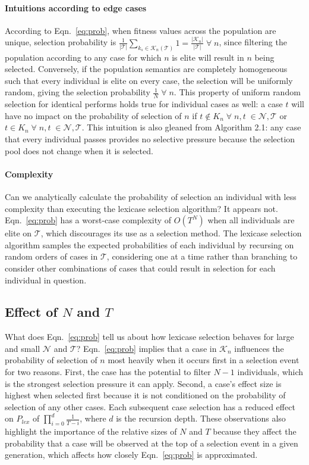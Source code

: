 \documentclass[twoside]{article}
\begin{document}
\paragraph{Intuitions according to edge cases}
According to Eqn.~\ref{eq:prob}, when fitness values across the population are unique, selection probability is $\frac{1}{|\mathcal{T}|} \sum_{k_s \in \mathcal{K}_n(\mathcal{T})} 1 = \frac{|\mathcal{K}_n|}{|\mathcal{T}|} \; \forall \; n$, since filtering the population according to any case for which $n$ is elite will result in $n$ being selected. Conversely, if the population semantics are completely homogeneous such that every individual is elite on every case, the selection will be uniformly random, giving the selection probability $\frac{1}{N} \; \forall \; n$. This property of uniform random selection for identical performs holds true for individual cases as well: a case $t$ will have no impact on the probability of selection of $n$ if $t \notin K_n \; \forall \; n,t \; \in \mathcal{N}, \mathcal{T}$ or $t \in K_n \; \forall \; n,t \; \in \mathcal{N}, \mathcal{T}$. This intuition is also gleaned from Algorithm 2.1: any case that every individual passes provides no selective pressure because the selection pool does not change when it is selected.


\paragraph{Complexity}
Can we analytically calculate the probability of selection an individual with less complexity than executing the lexicase selection algorithm? It appears not. Eqn.~\ref{eq:prob} has a worst-case complexity of $O(T^N)$ when all individuals are elite on $\mathcal{T}$, which discourages its use as a selection method. The lexicase selection algorithm samples the expected probabilities of each individual by recursing on random orders of cases in $\mathcal{T}$, considering one at a time rather than branching to consider other combinations of cases that could result in selection for each individual in question. 

 
\subsection{Effect of $N$ and $T$}

What does Eqn.~\ref{eq:prob} tell us about how lexicase selection behaves for large and small $\mathcal{N}$ and $\mathcal{T}$? Eqn.~\ref{eq:prob} implies that a case in $\mathcal{K}_n$ influences the probability of selection of $n$ most heavily when it occurs first in a selection event for two reasons. First, the case has the potential to filter $N-1$ individuals, which is the strongest selection pressure it can apply. Second, a case's effect size is highest when selected first because it is not conditioned on the probability of selection of any other cases. Each subsequent case selection has a reduced effect on $P_{lex}$ of $\prod_{i=0}^d{\frac{1}{T-i}}$, where $d$ is the recursion depth. These observations also highlight the importance of the relative sizes of $N$ and $T$ because they affect the probability that a case will be observed at the top of a selection event in a given generation, which affects how closely Eqn.~\ref{eq:prob} is approximated.  
\end{document}
